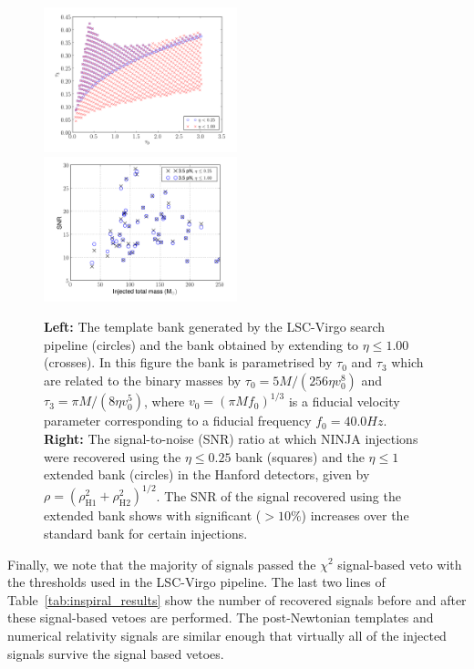 \begin{figure}
  \includegraphics[width=0.50\textwidth]{figures/ninja1/BankBoth}
  \includegraphics[width=0.50\textwidth]{figures/ninja1/HanfordSNR}
  \caption[NINJA1 results from the extended template bank]{
  {\bf Left:} The template bank generated by the LSC-Virgo
  search pipeline (circles) and the bank obtained by extending to
  $\eta \leq 1.00$ (crosses). In this figure the bank is parametrised
  by $\tau_0$ and $\tau_3$ which are related to the binary masses by
  $\tau_0 = 5M/(256\eta v_0^8)$ and $\tau_3 = \pi M/(8\eta v_0^5)$,
  where $v_0 = (\pi M f_0)^{1/3}$ is a fiducial velocity parameter
  corresponding to a fiducial frequency $f_0 = 40.0 Hz$.
  {\bf Right:} The
  signal-to-noise (SNR) ratio at which NINJA injections were recovered using
  the $\eta \le 0.25$ bank (squares) and the $\eta \le 1$ extended bank
  (circles) in the Hanford detectors, given by $\rho =
  (\rho_\mathrm{H1}^2 + \rho_\mathrm{H2}^2)^{1/2}$. The SNR of the signal
  recovered using the extended bank shows with significant ($> 10\%$) 
  increases over the standard bank for certain injections.}
  \label{f:templateBanks}
\end{figure}

Finally, we note that the majority of signals passed the $\chi^2$
signal-based veto with the thresholds used in the LSC-Virgo pipeline.  The
last two lines of Table~\ref{tab:inspiral_results} show the number of
recovered signals before and after these signal-based vetoes are
performed. The post-Newtonian templates and numerical relativity signals are
similar enough that virtually all of the injected signals survive the signal
based vetoes. 


